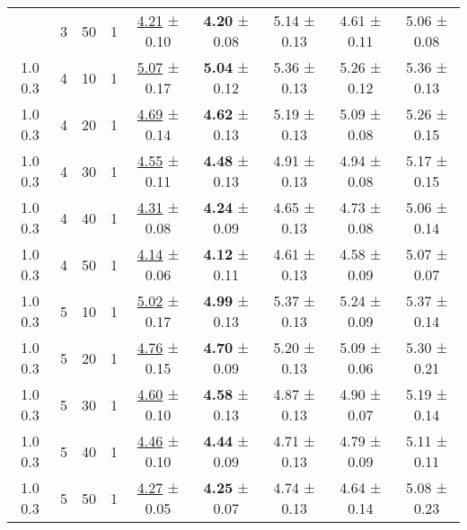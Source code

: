 \begin{tabular}{ccccccccc}
\begin{tabular}{lllllllll}
1.0 0.3 & 3 & 50 & 1 & \underline{4.21} ± 0.10 &    \textbf{4.20} ± 0.08 & 5.14 ± 0.13 & 4.61 ± 0.11 & 5.06 ± 0.08 \\
1.0 0.3 & 4 & 10 & 1 & \underline{5.07} ± 0.17 &    \textbf{5.04} ± 0.12 & 5.36 ± 0.13 & 5.26 ± 0.12 & 5.36 ± 0.13 \\
1.0 0.3 & 4 & 20 & 1 & \underline{4.69} ± 0.14 &    \textbf{4.62} ± 0.13 & 5.19 ± 0.13 & 5.09 ± 0.08 & 5.26 ± 0.15 \\
1.0 0.3 & 4 & 30 & 1 & \underline{4.55} ± 0.11 &    \textbf{4.48} ± 0.13 & 4.91 ± 0.13 & 4.94 ± 0.08 & 5.17 ± 0.15 \\
1.0 0.3 & 4 & 40 & 1 & \underline{4.31} ± 0.08 &    \textbf{4.24} ± 0.09 & 4.65 ± 0.13 & 4.73 ± 0.08 & 5.06 ± 0.14 \\
1.0 0.3 & 4 & 50 & 1 & \underline{4.14} ± 0.06 &    \textbf{4.12} ± 0.11 & 4.61 ± 0.13 & 4.58 ± 0.09 & 5.07 ± 0.07 \\
1.0 0.3 & 5 & 10 & 1 & \underline{5.02} ± 0.17 &    \textbf{4.99} ± 0.13 & 5.37 ± 0.13 & 5.24 ± 0.09 & 5.37 ± 0.14 \\
1.0 0.3 & 5 & 20 & 1 & \underline{4.76} ± 0.15 &    \textbf{4.70} ± 0.09 & 5.20 ± 0.13 & 5.09 ± 0.06 & 5.30 ± 0.21 \\
1.0 0.3 & 5 & 30 & 1 & \underline{4.60} ± 0.10 &    \textbf{4.58} ± 0.13 & 4.87 ± 0.13 & 4.90 ± 0.07 & 5.19 ± 0.14 \\
1.0 0.3 & 5 & 40 & 1 & \underline{4.46} ± 0.10 &    \textbf{4.44} ± 0.09 & 4.71 ± 0.13 & 4.79 ± 0.09 & 5.11 ± 0.11 \\
1.0 0.3 & 5 & 50 & 1 & \underline{4.27} ± 0.05 &    \textbf{4.25} ± 0.07 & 4.74 ± 0.13 & 4.64 ± 0.14 & 5.08 ± 0.23 \\
\bottomrule
\end{tabular}
